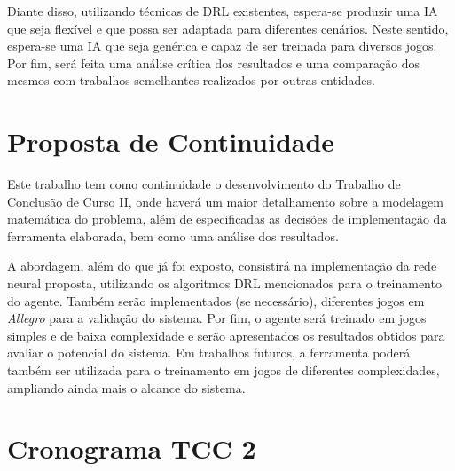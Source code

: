 Diante disso, utilizando técnicas de DRL existentes, espera-se produzir uma IA que seja flexível e que possa ser adaptada para diferentes cenários. Neste sentido, espera-se uma IA que seja genérica e capaz de ser treinada para diversos jogos. Por fim, será feita uma análise crítica dos resultados e uma comparação dos mesmos com trabalhos semelhantes realizados por outras entidades.
\clearpage
\section{Proposta de Continuidade} %
\label{sec:proposta_de_continuidade}

Este trabalho tem como continuidade o desenvolvimento do Trabalho de Conclusão de Curso II, onde haverá um maior detalhamento sobre a modelagem matemática do problema, além de especificadas as decisões de implementação da ferramenta elaborada, bem como uma análise dos resultados.

A abordagem, além do que já foi exposto, consistirá na implementação da rede neural proposta, utilizando os algoritmos DRL mencionados para o treinamento do agente. Também serão implementados (se necessário), diferentes jogos em \textit{Allegro} para a validação do sistema. Por fim, o agente será treinado em jogos simples e de baixa complexidade e serão apresentados os resultados obtidos para avaliar o potencial do sistema. Em trabalhos futuros, a ferramenta poderá também ser utilizada para o treinamento em jogos de diferentes complexidades, ampliando ainda mais o alcance do sistema.

 \section{Cronograma TCC 2}

